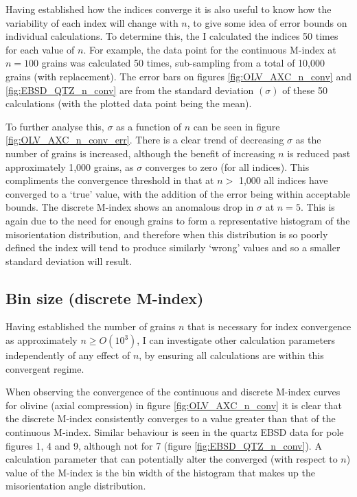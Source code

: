 \documentclass[a4paper,12pt]{report}
\numberwithin{equation}{chapter}
\begin{document}
Having established how the indices converge it is also useful to know how the variability of each index will change with $n$, to give some idea of error bounds on individual calculations. To determine this, the I calculated the indices 50 times for each value of $n$. For example, the data point for the continuous M-index at $n = 100$ grains was calculated 50 times, sub-sampling from a total of 10,000 grains (with replacement). The error bars on figures \ref{fig:OLV_AXC_n_conv} and \ref{fig:EBSD_QTZ_n_conv} are from the standard deviation $(\sigma)$ of these 50 calculations (with the plotted data point being the mean).

To further analyse this, $\sigma$ as a function of $n$ can be seen in figure \ref{fig:OLV_AXC_n_conv_err}. There is a clear trend of decreasing $\sigma$ as the number of grains is increased, although the benefit of increasing $n$ is reduced past approximately 1,000 grains, as $\sigma$ converges to zero (for all indices). This compliments the convergence threshold in that at $n >$ 1,000 all indices have converged to a \lq{}true\rq{} value, with the addition of the error being within acceptable bounds. The discrete M-index shows an anomalous drop in $\sigma$ at $n = 5$. This is again due to the need for enough grains to form a representative histogram of the misorientation distribution, and therefore when this distribution is so poorly defined the index will tend to produce similarly \lq{}wrong\rq{} values and so a smaller standard deviation will result.

\subsection{Bin size (discrete M-index)}

Having established the number of grains $n$ that is necessary for index convergence as approximately $n \geq O(10^{3})$, I can investigate other calculation parameters independently of any effect of $n$, by ensuring all calculations are within this convergent regime. 

When observing the convergence of the continuous and discrete M-index curves for olivine (axial compression) in figure \ref{fig:OLV_AXC_n_conv} it is clear that the discrete M-index consistently converges to a value greater than that of the continuous M-index. Similar behaviour is seen in the quartz EBSD data for pole figures 1, 4 and 9, although not for 7 (figure \ref{fig:EBSD_QTZ_n_conv}). A calculation parameter that can potentially alter the converged (with respect to $n$) value of the M-index is the bin width of the histogram that makes up the misorientation angle distribution.   
\end{document}
